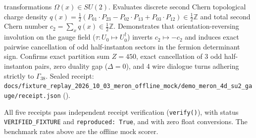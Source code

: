 \documentclass[
  11pt,
]{article}
\begin{document}
\begin{enumerate}
  transformations \(\Omega(x) \in SU(2)\). Evaluates discrete second Chern
  topological charge density
  \(q(x) = \frac{1}{2}(P_{01}\cdot P_{23} - P_{02}\cdot P_{13} + P_{03}\cdot P_{12}) \in \frac{1}{2}\mathbb{Z}\)
  and total second Chern number \(c_2 = \sum_x q(x) \in \frac{1}{2}\mathbb{Z}\).
  Demonstrates that orientation-reversing involution on the gauge field
  (\(\tau: U_0 \mapsto U_0^\dagger\)) inverts \(c_2 \mapsto -c_2\) and induces
  exact pairwise cancellation of odd half-instanton sectors in the fermion
  determinant sign. Confirms exact partition sum \(Z = 450\), exact
  cancellation of 3 odd half-instanton pairs, zero duality gap (\(\Delta = 0\)),
  and 4 wire dialogue turns adhering strictly to \(\Gamma_{38}\). Sealed receipt:
  \texttt{docs/\allowbreak{}fixture\_replay\_2026\_10\_03\_meron\_offline\_mock/\allowbreak{}demo\_\allowbreak{}meron\_\allowbreak{}4d\_\allowbreak{}su2\_\allowbreak{}gauge/\allowbreak{}receipt.json}
  (\texttt{}).
\end{enumerate}

All five receipts pass independent receipt verification
(\texttt{verify()}), with status \texttt{VERIFIED\_\allowbreak{}FIXTURE}
and \texttt{reproduced: True}, and with zero float conversions. The
benchmark rates above are the offline mock scorer.
\end{document}
